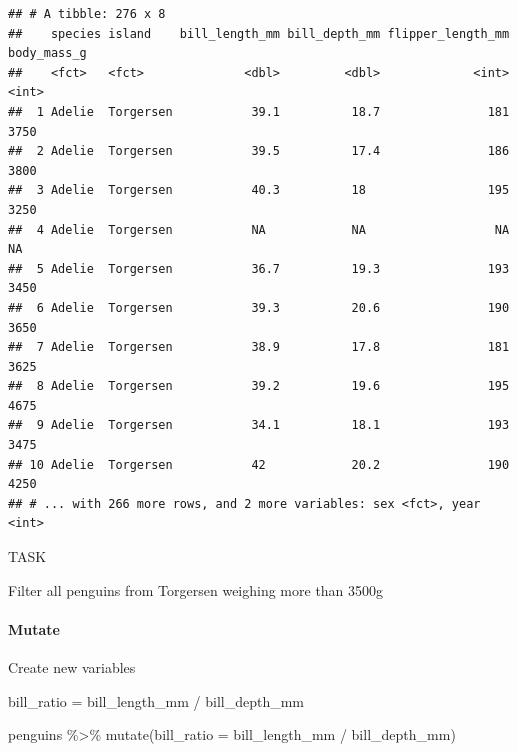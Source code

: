 \documentclass[
]{article}
\newenvironment{Shaded}{\begin{snugshade}}{\end{snugshade}}
\newcommand{\AttributeTok}[1]{\textcolor[rgb]{0.77,0.63,0.00}{#1}}
\newcommand{\FunctionTok}[1]{\textcolor[rgb]{0.00,0.00,0.00}{#1}}
\newcommand{\NormalTok}[1]{#1}
\newcommand{\SpecialCharTok}[1]{\textcolor[rgb]{0.00,0.00,0.00}{#1}}
\begin{document}
\begin{verbatim}
## # A tibble: 276 x 8
##    species island    bill_length_mm bill_depth_mm flipper_length_mm body_mass_g
##    <fct>   <fct>              <dbl>         <dbl>             <int>       <int>
##  1 Adelie  Torgersen           39.1          18.7               181        3750
##  2 Adelie  Torgersen           39.5          17.4               186        3800
##  3 Adelie  Torgersen           40.3          18                 195        3250
##  4 Adelie  Torgersen           NA            NA                  NA          NA
##  5 Adelie  Torgersen           36.7          19.3               193        3450
##  6 Adelie  Torgersen           39.3          20.6               190        3650
##  7 Adelie  Torgersen           38.9          17.8               181        3625
##  8 Adelie  Torgersen           39.2          19.6               195        4675
##  9 Adelie  Torgersen           34.1          18.1               193        3475
## 10 Adelie  Torgersen           42            20.2               190        4250
## # ... with 266 more rows, and 2 more variables: sex <fct>, year <int>
\end{verbatim}

TASK

Filter all penguins from Torgersen weighing more than 3500g

\hypertarget{mutate}{%
\paragraph{Mutate}\label{mutate}}

Create new variables

bill\_ratio = bill\_length\_mm / bill\_depth\_mm

\begin{Shaded}
\begin{Highlighting}[]
\NormalTok{penguins }\SpecialCharTok{\%\textgreater{}\%} 
  \FunctionTok{mutate}\NormalTok{(}\AttributeTok{bill\_ratio =}\NormalTok{ bill\_length\_mm }\SpecialCharTok{/}\NormalTok{ bill\_depth\_mm)}
\end{Highlighting}
\end{Shaded}
\end{document}
